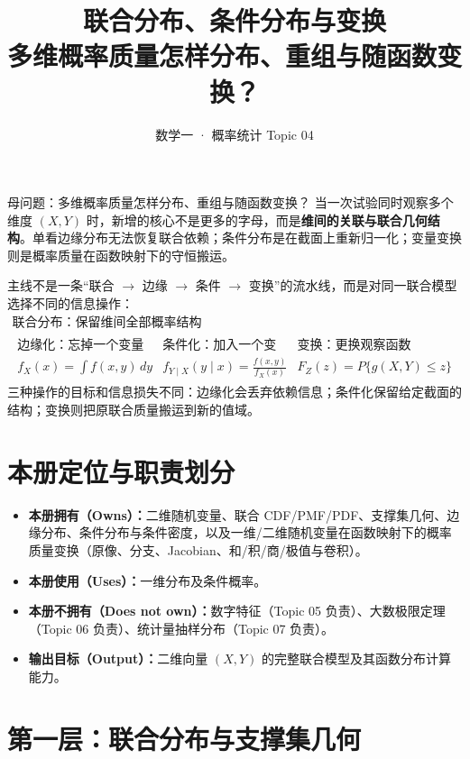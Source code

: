 \documentclass[11pt,a4paper]{ctexart}
\title{\vspace{-1.1cm}\textbf{联合分布、条件分布与变换}\\[0.4em]
\large 多维概率质量怎样分布、重组与随函数变换？}
\author{数学一 · 概率统计 Topic 04}
\date{}
\newcommand{\kw}[1]{\textbf{\color{deep}#1}}
\begin{document}
\maketitle

\begin{corebox}{母问题：多维概率质量怎样分布、重组与随函数变换？}
当一次试验同时观察多个维度 $(X,Y)$ 时，新增的核心不是更多的字母，而是\kw{维间的关联与联合几何结构}。单看边缘分布无法恢复联合依赖；条件分布是在截面上重新归一化；变量变换则是概率质量在函数映射下的守恒搬运。

主线不是一条“联合 $\to$ 边缘 $\to$ 条件 $\to$ 变换”的流水线，而是对同一联合模型选择不同的信息操作：
\[
\boxed{
\begin{array}{c}
\text{联合分布：保留维间全部概率结构}\\[0.6em]
\begin{array}{ccc}
\text{边缘化：忘掉一个变量} & \text{条件化：加入一个变量的信息} & \text{变换：更换观察函数}\\[-0.1em]
\displaystyle f_X(x)=\int f(x,y)\,dy
&
\displaystyle f_{Y\mid X}(y\mid x)=\frac{f(x,y)}{f_X(x)}
&
\displaystyle F_Z(z)=P\{g(X,Y)\le z\}
\end{array}
\end{array}}
\]
三种操作的目标和信息损失不同：边缘化会丢弃依赖信息；条件化保留给定截面的结构；变换则把原联合质量搬运到新的值域。
\end{corebox}

\section{本册定位与职责划分}

\begin{itemize}
  \item \kw{本册拥有（Owns）：}二维随机变量、联合 CDF/PMF/PDF、支撑集几何、边缘分布、条件分布与条件密度，以及一维/二维随机变量在函数映射下的概率质量变换（原像、分支、Jacobian、和/积/商/极值与卷积）。
  \item \kw{本册使用（Uses）：}一维分布及条件概率。
  \item \kw{本册不拥有（Does not own）：}数字特征（Topic 05 负责）、大数极限定理（Topic 06 负责）、统计量抽样分布（Topic 07 负责）。
  \item \kw{输出目标（Output）：}二维向量 $(X,Y)$ 的完整联合模型及其函数分布计算能力。
\end{itemize}

\section{第一层：联合分布与支撑集几何}
\end{document}
